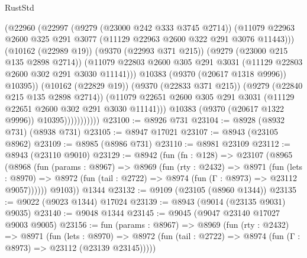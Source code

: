 \begin{lexlean}{RustStd}
\begin{coremodule}
                                (@22960
                                  (@22997
                                    (@9279 (@23000 @242 @333 @3745 @2714))
                                    (@11079
                                      @22963
                                      @2600
                                      @325
                                      @291
                                      @3077
                                      (@11129 @22963 @2600 @322 @291 @3076 @11443)))
                                  (@10162 (@22989 @19))
                                  (@9370 (@22993 @371 @215))
                                  (@9279 (@23000 @215 @135 @2898 @2714))
                                  (@11079
                                    @22803
                                    @2600
                                    @305
                                    @291
                                    @3031
                                    (@11129 @22803 @2600 @302 @291 @3030 @11141)))
                                @10383
                                (@9370 (@20617 @1318 @9996))
                                @10395))
                            (@10162 (@22829 @19))
                            (@9370 (@22833 @371 @215))
                            (@9279 (@22840 @215 @135 @2898 @2714))
                            (@11079
                              @22651
                              @2600
                              @305
                              @291
                              @3031
                              (@11129 @22651 @2600 @302 @291 @3030 @11141)))
                          @10383
                          (@9370 (@20617 @1322 @9996))
                          @10395)))))))))))
@23100 := @8926 @731
@23104 := @8928 (@8932 @731) (@8938 @731)
@23105 := @8947 @17021
@23107 := @8943 (@23105 @8962)
@23109 := @8985 (@8986 @731)
@23110 := @8981 @23109
@23112 := @8943 (@23110 @9010)
@23129 := @8942
    (fun (fn : @128) =>
    @23107
      (@8965
        (@8968
          (fun (params : @8967) =>
          @8969
            (fun (rty : @2432) =>
            @8971
              (fun (lets : @8970) =>
              @8972 (fun (tail : @2722) => @8974 (fun (Γ : @8973) => @23112 @9057))))))
        @9103))
    @1344
@23132 := @9109 (@23105 (@8960 @1344))
@23135 := @9022 (@9023 @1344) @17024
@23139 := @8943 (@9014 (@23135 @9031) @9035)
@23140 := @9048 @1344
@23145 := @9045 (@9047 @23140 @17027 @9003 @9005)
@23156 := fun (params : @8967) =>
  @8969
    (fun (rty : @2432) =>
    @8971
      (fun (lets : @8970) =>
      @8972 (fun (tail : @2722) => @8974 (fun (Γ : @8973) => @23112 (@23139 @23145)))))

\end{coremodule}
\end{lexlean}
